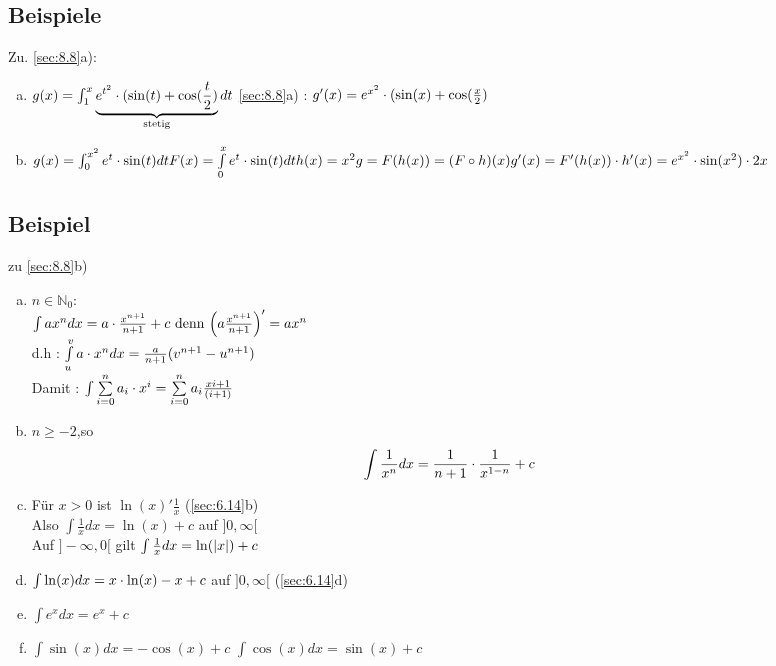 \subsection{Beispiele}
Zu. \ref{sec:8.8}a):
\begin{enumerate}[a)]
\item $g(x) = \int_{1}^{x} \underbrace{e^{t^2} \cdot (\sin(t) + \cos(\frac{t}{2})}_{\text{stetig}} dt$
\ref{sec:8.8}a) : $g'(x) = e^{x^2} \cdot (\sin(x) + \cos(\frac{x}{2})$
\item $g(x) = \int_{0}^{x^2} e^t \cdot \sin(t)dt\\
F(x) = \int\limits_{0}^{x} e^t \cdot \sin(t)dt\\
h(x) = x^2\\
g = F(h(x)) = (F \circ h)(x)\\
g'(x) = F'(h(x)) \cdot h'(x) = e^{x^2} \cdot \sin(x^2) \cdot 2x$\\
\end{enumerate}
\subsection{Beispiel}\label{sec:8.10}
zu \ref{sec:8.8}b)
\begin{enumerate}[a)]
\item $n \in \mathbb{N}_0$:\\
$ \int a x^n dx = a \cdot \frac{x^{n+1}}{n+1} + c \text{ denn } \Bigl(a\frac{x^{n+1}}{n+1}\Bigr)' = ax^n$\\
d.h : $\int\limits_{u}^{v} a \cdot x^n dx = \frac{a}{n+1} (v^{n+1} - u^{n+1})$\\
Damit : $\int \sum\limits_{i=0}^{n} a_i \cdot x^i = \sum\limits_{i=0}^{n} a_i \frac{x{i+1}}{(i+1)}$
\item $n \ge -2$,so \[ \int \frac{1}{x^n} dx = \frac{1}{n+1} \cdot \frac{1}{x^{1-n}} +c \]
\item Für $ x > 0$ ist $\ln(x)' \frac{1}{x}$ \hfill (\ref{sec:6.14}b)\\
Also $\int \frac{1}{x} dx = \ln(x) + c$ auf $]0,\infty[$\\
Auf $]-\infty,0[$ gilt $\int \frac{1}{x}dx = \ln(\lvert x \rvert) +c$
\item $\int \ln(x)dx = x \cdot \ln(x) - x + c$ auf $]0,\infty[$ \hfill (\ref{sec:6.14}d)
\item $\int e^x dx = e^x+c$
\item $\int \sin(x)dx = -\cos(x) +c$
$\int \cos(x) dx = \sin(x) +c$
\end{enumerate}
